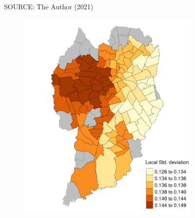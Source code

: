 \begin{figure}[!htbp]
\begin{subfigure}{0.5\textwidth}
    \end{subfigure}    
    \label{fig:sp_mean}
    \par SOURCE: The Author (2021)
\end{figure}

\begin{figure}[!htbp]
    \centering\footnotesize
    \captionsetup{font=footnotesize}
    \caption{SPEEDING GW LOCAL SD}
    \begin{subfigure}{0.5\textwidth}
        \includegraphics{fig/sd_map.png}
    \end{subfigure}%
    \begin{subfigure}{0.5\textwidth}

\end{subfigure}
\end{figure}
